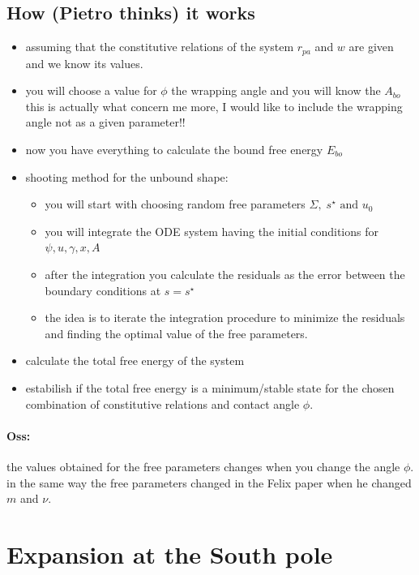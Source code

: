 \documentclass[12pt]{article}
\begin{document}
\subsection{How (Pietro thinks) it works}
\begin{itemize}
  \item assuming that the constitutive relations of the system $r_{pa}$ and $w$ are given and we know its values.
  \item you will choose a value for $\phi$ the wrapping angle and you will know the $A_{bo}$ \alert{this is actually what concern me more, I would like to include the wrapping angle not as a given parameter!!}
  \item now you have everything to calculate the bound free energy $E_{bo}$
  \item shooting method for the unbound shape: 
    \begin{itemize}
      \item you will start with choosing random free parameters $\Sigma,\; s^\star \text{ and }u_0$
      \item you will integrate the ODE system having the initial conditions for $\psi,u,\gamma,x,A$
      \item after the integration you calculate the residuals as the error between the boundary conditions at $s=s^\star$
      \item the idea is to iterate the integration procedure to minimize the residuals and finding the optimal value of the free parameters.
    \end{itemize}
  \item calculate the total free energy of the system
  \item estabilish if the total free energy is a minimum/stable state for the chosen combination of constitutive relations and contact angle $\phi$.
\end{itemize}


\paragraph{Oss:} the values obtained for the free parameters changes when you change the angle $\phi$. in the same way the free parameters changed in the Felix paper when he changed $m$ and $\nu$.


\section{Expansion at the South pole}
\end{document}
